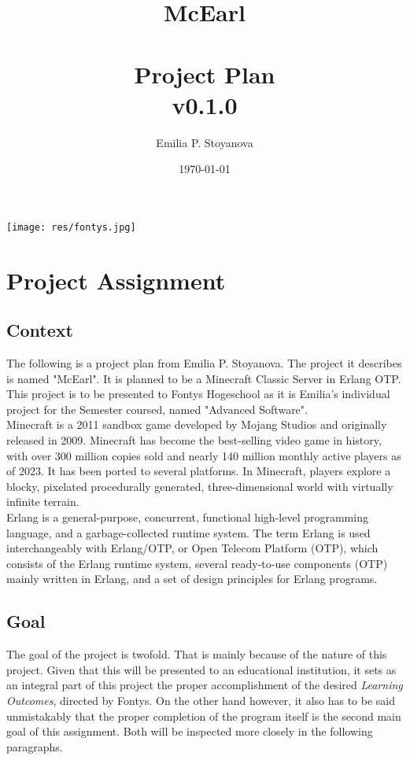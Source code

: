 \documentclass{article}
\title{\textbf{McEarl} \\ \hfill \\ \large Project Plan \\ \large v0.1.0}
\author{Emilia P. Stoyanova}
\date{\today}
\begin{document}
\maketitle
\begin{center}
    \texttt{[image: res/fontys.jpg]}
\end{center}

\newpage
\tableofcontents
\listoftables

\newpage
\section{Project Assignment}
\fancyhead[l]{\leftmark}
\fancyhead[r]{\rightmark}
\fancyfoot[c]{\thepage}

    \subsection{Context}
    The following is a project plan from Emilia P. Stoyanova. The project it describes is named "McEarl". It is planned to be a Minecraft Classic Server in Erlang OTP. This project is to be presented to Fontys Hogeschool as it is Emilia's individual project for the  Semester coursed, named "Advanced Software". \\

    Minecraft is a 2011 sandbox game developed by Mojang Studios and originally released in 2009. Minecraft has become the best-selling video game in history, with over 300 million copies sold and nearly 140 million monthly active players as of 2023. It has been ported to several platforms. In Minecraft, players explore a blocky, pixelated procedurally generated, three-dimensional world with virtually infinite terrain. \\

    Erlang is a general-purpose, concurrent, functional high-level programming language, and a garbage-collected runtime system. The term Erlang is used interchangeably with Erlang/OTP, or Open Telecom Platform (OTP), which consists of the Erlang runtime system, several ready-to-use components (OTP) mainly written in Erlang, and a set of design principles for Erlang programs.

    \newpage
    \subsection{Goal}
    The goal of the project is twofold. That is mainly because of the nature of this project. Given that this will be presented to an educational institution, it sets as an integral part of this project the proper accomplishment of the desired \emph{Learning Outcomes}, directed by Fontys. On the other hand however, it also has to be said unmistakably that the proper completion of the program itself is the second main goal of this assignment. Both will be inspected more closely in the following paragraphs. \\
\end{document}
